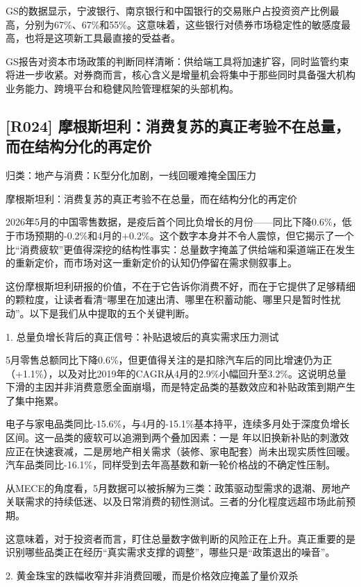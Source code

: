 \documentclass[11pt]{ctexart}
\begin{document}
GS的数据显示，宁波银行、南京银行和中国银行的交易账户占投资资产比例最高，分别为67\%、67\%和55\%。这意味着，这些银行对债券市场稳定性的敏感度最高，也将是这项新工具最直接的受益者。

GS报告对资本市场政策的判断同样清晰：供给端工具将加速扩容，同时监管约束将进一步收紧。对券商而言，核心含义是增量机会将集中于那些同时具备强大机构业务能力、跨境平台和稳健风险管理框架的头部机构。

\subsection{[R024] 摩根斯坦利：消费复苏的真正考验不在总量，而在结构分化的再定价}
{\small\color{refgray}归类：地产与消费：K型分化加剧，一线回暖难掩全国压力}

摩根斯坦利：消费复苏的真正考验不在总量，而在结构分化的再定价

2026年5月的中国零售数据，是疫后首个同比负增长的月份——同比下降0.6\%，低于市场预期的-0.2\%和4月的+0.2\%。这个数字本身并不令人震惊，但它揭示了一个比“消费疲软”更值得深挖的结构性事实：总量数字掩盖了供给端和渠道端正在发生的重新定价，而市场对这一重新定价的认知仍停留在需求侧叙事上。

这份摩根斯坦利研报的价值，不在于它告诉你消费不好，而在于它提供了足够精细的颗粒度，让读者看清“哪里在加速出清、哪里在积蓄动能、哪里只是暂时性扰动”。以下是我们从中提取的五个关键判断。

1. 总量负增长背后的真正信号：补贴退坡后的真实需求压力测试

5月零售总额同比下降0.6\%，但更值得关注的是扣除汽车后的同比增速仍为正（+1.1\%），以及对比2019年的CAGR从4月的2.9\%小幅回升至3.2\%。这说明总量下滑的主因并非消费意愿全面崩塌，而是特定品类的基数效应和补贴政策到期产生了集中拖累。

电子与家电品类同比-15.6\%，与4月的-15.1\%基本持平，连续多月处于深度负增长区间。这一品类的疲软可以追溯到两个叠加因素：一是 年以旧换新补贴的刺激效应正在快速衰减，二是房地产相关需求（装修、家电配套）尚未出现实质性回暖。汽车品类同比-16.1\%，同样受到去年高基数和新一轮价格战的不确定性压制。

从MECE的角度看，5月数据可以被拆解为三类：政策驱动型需求的退潮、房地产关联需求的持续低迷、以及日常消费的韧性测试。三者的分化程度远超市场此前预期。

这意味着，对于投资者而言，盯住总量数字做判断的风险正在上升。真正重要的是识别哪些品类正在经历“真实需求支撑的调整”，哪些只是“政策退出的噪音”。

2. 黄金珠宝的跌幅收窄并非消费回暖，而是价格效应掩盖了量价双杀
\end{document}
